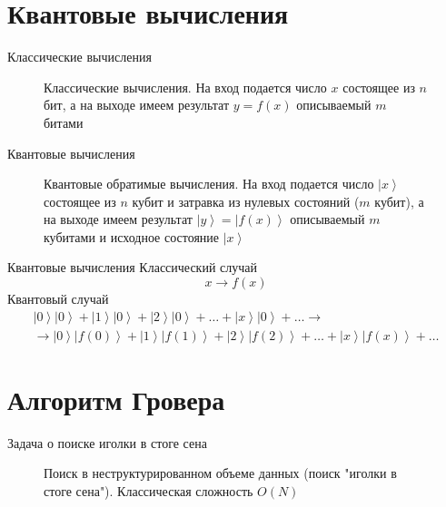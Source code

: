\documentclass[10pt,pdf,hyperref={unicode}]{beamer}
\begin{document}
\section{Квантовые вычисления}
\begin{frame}{Классические вычисления}
\begin{figure}
\centering



\caption{Классические вычисления. На вход подается число $x$ состоящее
  из $n$ бит, а на выходе имеем результат $y = f\left(x\right)$ описываемый $m$ битами}
\label{figQuantCompClassComp}
\end{figure}
\end{frame}

\begin{frame}{Квантовые вычисления}
\begin{figure}
\centering

\scalebox{.8}{}

\caption{Квантовые обратимые вычисления. На вход подается число
  $\left|x\right>$ состоящее из $n$ кубит и затравка из нулевых
  состояний ($m$ кубит), а на выходе имеем результат $\left|y\right> =
  \left|f\left(x\right)\right>$ описываемый $m$ кубитами и исходное
  состояние $\left|x\right>$} 
\label{figQuantCompQuantComp}
\end{figure}
\end{frame}


\begin{frame}{Квантовые вычисления}
Классический случай
\[
x \to f(x)
\]
Квантовый случай
\begin{eqnarray}
\left|0\right>\left|0\right> + \left|1\right>\left|0\right> + \left|2\right>\left|0\right> +
\dots + \left|x\right>\left|0\right> + \dots \to
\nonumber \\
\to 
\left|0\right>\left|f(0)\right> + \left|1\right>\left|f(1)\right> + \left|2\right>\left|f(2)\right> +
\dots + \left|x\right>\left|f(x)\right> + \dots
\nonumber
\end{eqnarray}
\end{frame}


\section{Алгоритм Гровера}
\begin{frame}{Задача о поиске иголки в стоге сена}
\begin{figure}
\centering



\caption{Поиск в неструктурированном объеме данных (поиск "иголки в
  стоге сена"). Классическая сложность $O(N)$}
\label{figQuantCompSearch}
\end{figure}
\end{frame}
\end{document}
